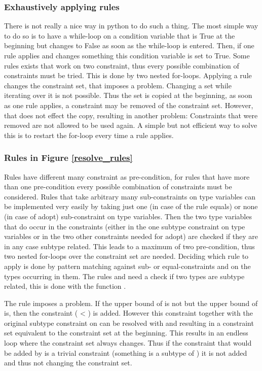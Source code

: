 \subsubsection{Exhaustively applying rules}
There is not really a nice way in python to do such a thing. The most simple way to do so is to have a while-loop on a condition variable  that is True at the beginning but changes to False as soon as the while-loop is entered. Then, if one rule applies and changes something this condition variable is set to True.
Some rules exists that work on two constraint, thus every possible combination of constraints must be tried. This is done by two nested for-loops.
Applying a rule changes the constraint set, that imposes a problem. Changing a set while iterating over it is not possible. Thus the set is copied at the beginning, as soon as one rule applies, a constraint may be removed of the constraint set. However, that does not effect the copy, resulting in another problem: Constraints that were removed are not allowed to be used again.
A simple but not efficient way to solve this is to restart the for-loop every time a rule applies.

\subsubsection{Rules in Figure \ref{resolve_rules}}
Rules have different many constraint as pre-condition, for rules that have more than one pre-condition every possible combination of constraints must be considered. Rules that take arbitrary many sub-constraints on type variables can be implemented very easily by taking just one (in case of the rule equals) or none (in case of adopt) sub-constraint on type variables.
Then the two type variables that do occur in the constraints (either in the one subtype constraint on type variables or in the two other constraints needed for adopt) are checked if they are in any case subtype related.
This leads to a maximum of two pre-condition, thus two nested for-loops over the constraint set are needed.
Deciding which rule to apply is done by pattern matching against sub- or equal-constraints and on the types occurring in them.
The rules  and  need a check if two types are subtype related, this is done with the function .

The rule  imposes a problem. If the upper bound of  is not  but the upper bound of  is, then the constraint ( < ) is added. However this constraint together with the original subtype constraint on  can be resolved with  and  resulting in a constraint set equivalent to the constraint set at the beginning.
This results in an endless loop where the constraint set always changes. Thus if the constraint that would be added by  is a trivial constraint (something is a subtype of ) it is not added and thus not changing the constraint set.

